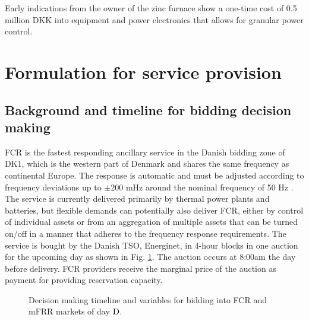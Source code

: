 \documentclass[conference]{IEEEtran}
\begin{document}
Early indications from the owner of the zinc furnace show a one-time cost of 0.5 million DKK into equipment and power electronics that allows for granular power control.


\vspace{1mm}
\section{Formulation for service provision} 
\label{opt}
\vspace{-1mm}
\subsection{Background and timeline for bidding decision making}
\vspace{-1mm}
FCR is the fastest responding ancillary service in the Danish bidding zone of DK1, which is the western part of Denmark and shares the same frequency as continental Europe. The response is automatic and must be adjusted according to frequency deviations up to $\pm 200$ mHz around the nominal frequency of 50 Hz \cite{energinet:prequalification}. The service is currently delivered primarily by thermal power plants and batteries, but flexible demands can potentially also deliver FCR, either by control of individual assets or from an aggregation of multiple assets that can be turned on/off in a manner that adheres to the frequency response requirements. The service is bought by the Danish TSO, Energinet, in 4-hour blocks in one auction for the upcoming day as shown in Fig. \ref{fig:timeline}. The auction occurs at 8:00am the day before delivery. FCR providers receive the marginal price of the auction as payment for providing reservation capacity.

\begin{figure}
    \begin{adjustbox}{width=\columnwidth}
        
    \end{adjustbox}
    \caption{\small{Decision making timeline and variables for bidding into FCR and mFRR markets of day $\rm{D}$. %
    \vspace{-3mm}}}
    \label{fig:timeline}
\end{figure}
\end{document}
